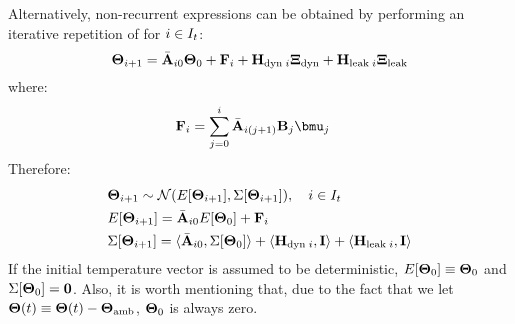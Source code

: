 Alternatively, non-recurrent expressions can be obtained by performing an iterative repetition of  for $i \in I_t$:
\begin{equation} \equlabel{tta-fourier-process-variation-non-recurrent}
  \vtemp_{i + 1} = \am{A}_{i0} \vtemp_0 + \v{F}_i + \m{H}_{\dyn \; i} \vnormal_\dyn + \m{H}_{\leak \; i} \vnormal_\leak
\end{equation}
where:
\begin{align}
  & \v{F}_i = \sum_{j = 0}^{i} \am{A}_{i(j+1)} \m{B}_j \vmean{j} \equlabel{f}
\end{align}
Therefore:
\begin{align*}
  & \mathbf{\Theta}_{i + 1} \sim \mathcal{N}(E[\mathbf{\Theta}_{i + 1}], \Sigma[\mathbf{\Theta}_{i + 1}]), \hspace{10pt} i \in I_t \\
  & E[\mathbf{\Theta}_{i + 1}] = \Bar{\mathbf{A}}_{i0} E[\mathbf{\Theta}_0] + \mathbf{F}_i \\
  & \Sigma[\mathbf{\Theta}_{i + 1}] = \langle \Bar{\mathbf{A}}_{i0}, \Sigma[\mathbf{\Theta}_0] \rangle + \langle \mathbf{H}_{\text{dyn} \; i}, \mathbf{I} \rangle + \langle \mathbf{H}_{\text{leak} \; i}, \mathbf{I} \rangle
\end{align*}
If the initial temperature vector is assumed to be deterministic, $E[\mathbf{\Theta}_0] \equiv \mathbf{\Theta}_0$ and $\Sigma[\mathbf{\Theta}_0] = \mathbf{0}$. Also, it is worth mentioning that, due to the fact that we let $\mathbf{\Theta}(t) \equiv \mathbf{\Theta}(t) - \mathbf{\Theta}_{\text{amb}}$, $\mathbf{\Theta}_0$ is always zero.
